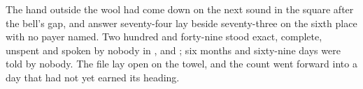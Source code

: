 The hand outside the wool had come down on the next sound in the square after the bell's gap, and answer seventy-four lay beside seventy-three on the sixth place with no payer named. Two hundred and forty-nine stood exact, complete, unspent and spoken by nobody in ,  and ; six months and sixty-nine days were told by nobody. The file lay open on the towel, and the count went forward into a day that had not yet earned its heading.
